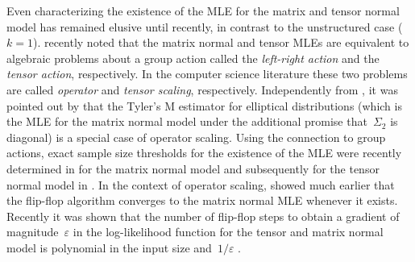 \documentclass[aos]{imsart}
\theoremstyle{definition}
\numberwithin{equation}{section}
\newcommand{\eps}{\varepsilon}
\newcommand{\CF}[1]{{\color{purple}[CF: #1]}}
\newcommand{\CF}[1]{{}}
\begin{document}
Even characterizing the existence of the MLE for the matrix and tensor normal model has remained elusive until recently, in contrast to the unstructured case ($k=1$).
\cite{amendola2020invariant} recently noted that the matrix normal and tensor MLEs are equivalent to algebraic problems about a group action called the \emph{left-right action} and the \emph{tensor action}, respectively.
In the computer science literature these two problems are called \emph{operator} and \emph{tensor scaling}, respectively.
Independently from \cite{amendola2020invariant}, it was pointed out by \cite{FM20} that the Tyler's M estimator for elliptical distributions (which is the MLE for the matrix normal model under the additional promise that~$\Sigma_2$ is diagonal) is a special case of operator scaling.
Using the connection to group actions, exact sample size thresholds for the existence of the MLE were recently determined in \cite{derksen2020matrix} for the matrix normal model and subsequently for the tensor normal model in \cite{derksen2020tensor}.
In the context of operator scaling, \cite{gurvits2004classical} showed much earlier that the flip-flop algorithm converges to the matrix normal MLE whenever it exists.
Recently it was shown that the number of flip-flop steps to obtain a gradient of magnitude~$\eps$ in the log-likelihood function for the tensor and matrix normal model is polynomial in the input size and~$1/\eps$ \citep{GGOW19,burgisser2017alternating,burgisser2019towards}.


\end{document}
